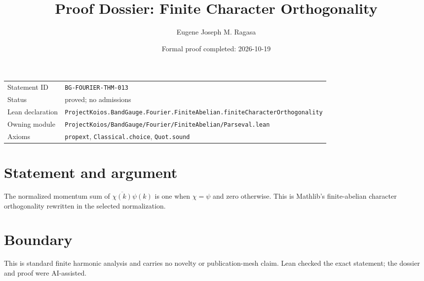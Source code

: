 \documentclass[11pt]{article}
\title{Proof Dossier: Finite Character Orthogonality}
\author{Eugene Joseph M. Ragasa}
\date{Formal proof completed: 2026-10-19}
\begin{document}
\maketitle
\noindent\begin{tabularx}{\textwidth}{@{}lX@{}}\toprule
Statement ID & \texttt{BG-FOURIER-THM-013} \\
Status & proved; no admissions \\
Lean declaration & \texttt{ProjectKoios.BandGauge.Fourier.FiniteAbelian.}\newline\texttt{finiteCharacterOrthogonality} \\
Owning module & \texttt{ProjectKoios/BandGauge/Fourier/FiniteAbelian/Parseval.lean} \\
Axioms & \texttt{propext}, \texttt{Classical.choice}, \texttt{Quot.sound} \\
\bottomrule\end{tabularx}
\section{Statement and argument}
The normalized momentum sum of $\overline{\chi(k)}\psi(k)$ is one when $\chi=\psi$ and zero otherwise. This is Mathlib's finite-abelian character orthogonality rewritten in the selected normalization.
\section{Boundary}
This is standard finite harmonic analysis and carries no novelty or publication-mesh claim. Lean checked the exact statement; the dossier and proof were AI-assisted.
\end{document}
